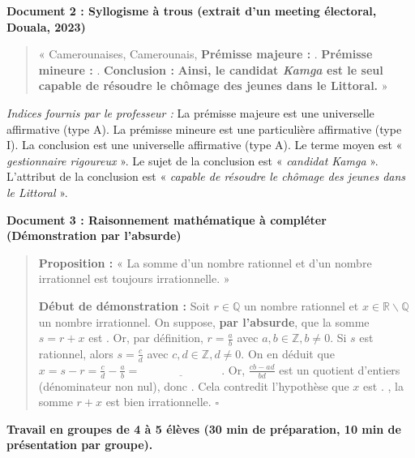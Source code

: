 \documentclass[11pt]{article}
\newcounter{popsec}
\newcounter{popsub}
\newcommand{\courssub}[1]{%
  \stepcounter{popsub}%
  \par\vspace{9pt}\noindent{\popxbold\fontsize{11.5}{13}\selectfont\color{popink}{\color{poporange}\thepopsec.\thepopsub}\hspace{6pt}#1}\par\nopagebreak\vspace{4pt}
}
\def\setminus{\mathbin{\backslash}}\let\smallsetminus\setminus
\begin{document}
\bigskip
\noindent\textbf{Document 2 : Syllogisme à trous (extrait d'un meeting électoral, Douala, 2023)}
\begin{quote}
« Camerounaises, Camerounais,
\textbf{Prémisse majeure :} \underline{\hspace{5cm}}.
\textbf{Prémisse mineure :} \underline{\hspace{5cm}}.
\textbf{Conclusion :} \textbf{Ainsi, le candidat \emph{Kamga} est le seul capable de résoudre le chômage des jeunes dans le Littoral.} »
\end{quote}
\emph{Indices fournis par le professeur :} La prémisse majeure est une universelle affirmative (type A). La prémisse mineure est une particulière affirmative (type I). La conclusion est une universelle affirmative (type A). Le terme moyen est « \emph{gestionnaire rigoureux} ». Le sujet de la conclusion est « \emph{candidat Kamga} ». L'attribut de la conclusion est « \emph{capable de résoudre le chômage des jeunes dans le Littoral} ».

\bigskip
\noindent\textbf{Document 3 : Raisonnement mathématique à compléter (Démonstration par l'absurde)}
\begin{quote}
\textbf{Proposition :} « La somme d'un nombre rationnel et d'un nombre irrationnel est toujours irrationnelle. »

\textbf{Début de démonstration :}
Soit $r \in \mathbb{Q}$ un nombre rationnel et $x \in \mathbb{R} \setminus \mathbb{Q}$ un nombre irrationnel.
On suppose, \textbf{par l'absurde}, que la somme $s = r + x$ est \underline{\hspace{3cm}}.
Or, par définition, $r = \frac{a}{b}$ avec $a,b \in \mathbb{Z}, b \neq 0$.
Si $s$ est rationnel, alors $s = \frac{c}{d}$ avec $c,d \in \mathbb{Z}, d \neq 0$.
On en déduit que $x = s - r = \frac{c}{d} - \frac{a}{b} = \underline{\hspace{3cm}}$.
Or, $\frac{cb - ad}{bd}$ est un quotient d'entiers (dénominateur non nul), donc \underline{\hspace{3cm}}.
Cela contredit l'hypothèse que $x$ est \underline{\hspace{3cm}}.
\underline{\hspace{3cm}}, la somme $r+x$ est bien irrationnelle. \hfill $\square$
\end{quote}

\courssub{Consignes}
\textbf{Travail en groupes de 4 à 5 élèves (30 min de préparation, 10 min de présentation par groupe).}
\end{document}
